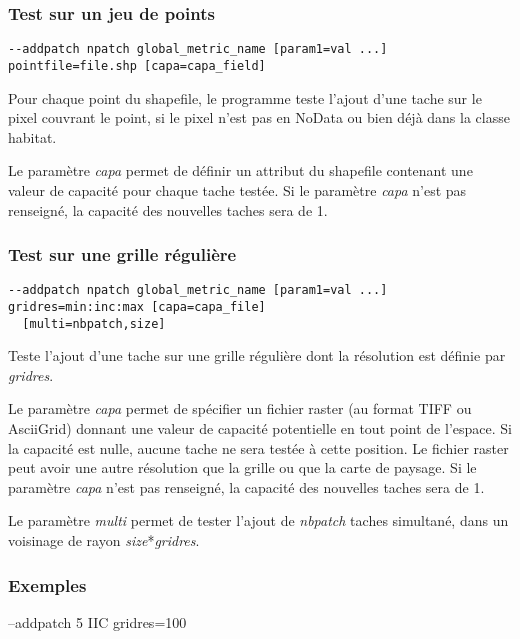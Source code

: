 \documentclass[a4paper,10pt]{report}
\newenvironment{cmd}
{\quote\Verbatim}
{\endVerbatim\endquote}
\begin{document}
\subsubsection{Test sur un jeu de points}
\begin{verbatim}
--addpatch npatch global_metric_name [param1=val ...] pointfile=file.shp [capa=capa_field]
\end{verbatim}
Pour chaque point du shapefile, le programme teste l'ajout d'une tache sur le pixel couvrant le point, si le pixel n'est pas en NoData ou bien déjà dans la classe habitat.

Le paramètre \textit{capa} permet de définir un attribut du shapefile contenant une valeur de capacité pour chaque tache testée.
Si le paramètre \textit{capa} n'est pas renseigné, la capacité des nouvelles taches sera de 1.


\subsubsection{Test sur une grille régulière}
\begin{verbatim}
--addpatch npatch global_metric_name [param1=val ...] gridres=min:inc:max [capa=capa_file] 
  [multi=nbpatch,size]
\end{verbatim}
Teste l'ajout d'une tache sur une grille régulière dont la résolution est définie par \textit{gridres}.

Le paramètre \textit{capa} permet de spécifier un fichier raster (au format TIFF ou AsciiGrid) donnant une valeur de capacité potentielle en tout point de l'espace. 
Si la capacité est nulle, aucune tache ne sera testée à cette position. Le fichier raster peut avoir une autre résolution que la grille ou que la carte de paysage.
Si le paramètre \textit{capa} n'est pas renseigné, la capacité des nouvelles taches sera de 1.

Le paramètre \textit{multi} permet de tester l'ajout de \textit{nbpatch} taches simultané, dans un voisinage de rayon \textit{size}*\textit{gridres}.

\subsubsection{Exemples}

\begin{cmd}
--addpatch 5 IIC gridres=100
\end{cmd}
\end{document}
